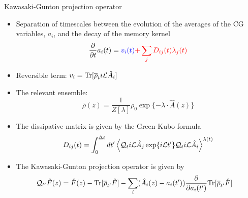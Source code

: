 \documentclass{beamer}
\begin{document}
\begin{frame}{Kawasaki-Gunton projection operator}
  \begin{itemize}
     \item<1-> Separation of timescales between the evolution of the averages of the CG variables, $a_i$, and the decay of the memory kernel 
\begin{equation}
  \frac{\partial}{\partial t}a_i(t) = {\color{blue} v_i(t)} {\color{red} +\sum_j D_{ij}(t) \lambda_j(t)}
\nonumber
\end{equation}
\item<2-> {\color{blue} Reversible term}: $v_i={\rm Tr}[\overline{\rho}_t i{\cal L}\hat{A}_i]$ 
\item<3-> The relevant ensemble: 
  \begin{equation}
  \overline{\rho}(z) = \frac{1}{Z[\lambda]} \rho_0\exp\{-\lambda\!\cdot\!\hat{A}(z)\}
  \nonumber
  \end{equation}
\item<4-> {\color{red} The  dissipative matrix}  is  given  by  the Green-Kubo  formula
\begin{equation}
D_{ij}(t)=\int_0^{\Delta t} dt'\left\langle 
{\cal Q}_t i{\cal L}\hat{A}_j\exp\{i{\cal L}t'\}{\cal Q}_t i{\cal L}\hat{A}_i
\right\rangle^{\lambda(t)}
\label{dij}
\nonumber
\end{equation}
\item<5-> The Kawasaki-Gunton projection operator is given by 
  \begin{align}
    {\cal Q}_{t'}\hat{F}(z) &= \hat{F}(z)- {\rm Tr}[\overline{\rho}_{t'} \hat{F}]
  -\sum_i(\hat{A}_i(z)-a_i(t'))\frac{\partial }{\partial a_i(t')}
  {\rm Tr}[\overline{\rho}_{t'} \hat{F}]
  \label{Q}
  \nonumber
  \end{align}
\end{itemize}
\end{frame}
\end{document}
